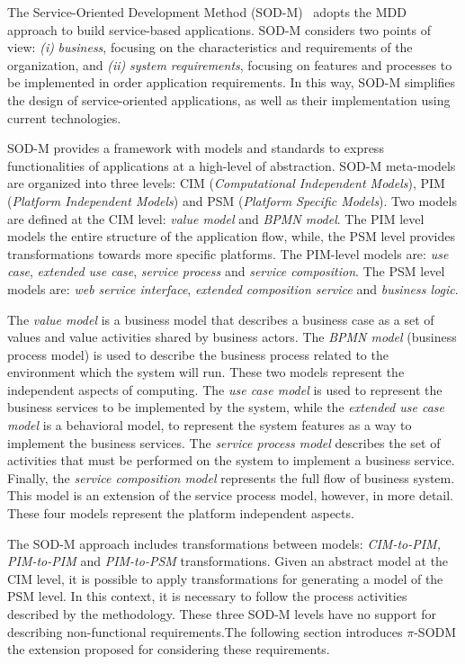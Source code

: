 
The Service-Oriented Development Method (SOD-M)~\cite{decastro1}
adopts  the MDD approach to build service-based applications. SOD-M considers two points of view:
\textit{(i)} \textit{business}, focusing on the characteristics and requirements
of the organization, and \textit{(ii)} \textit{system requirements}, focusing on
features and processes to be implemented in order application requirements. In
this way, SOD-M  simplifies the design of service-oriented applications, as
well as their implementation using current technologies.

SOD-M provides a framework with models and standards to express functionalities
of applications at a high-level of abstraction. SOD-M meta-models are organized 
into three levels: CIM (\textit{Computational Independent Models}), 
PIM (\textit{Platform Independent Models}) and PSM (\textit{Platform Specific Models}).
Two models are defined at the CIM level: \textit{value model} 
and \textit{BPMN model}. 
The PIM level models the entire structure of the application flow,
while, the PSM level provides transformations towards more specific platforms.
The PIM-level models are: \textit{use case}, \textit{extended use case}, \textit{service process} and
\textit{service composition}. The PSM level models are: \textit{web service interface}, \textit{extended composition service} and \textit{business logic}. 
 
The \textit{value model} is a business model that describes a business
case as a set of values and value activities shared by business actors. The
\textit{BPMN model} (business process model) is used to describe the business
process related to the environment which the system will run. These two models
represent the independent aspects of computing. The \textit{use case model} is used to represent
the business services to be implemented by the system, while the \textit{extended use case model} is a
behavioral model, to represent the system features as a way to implement
the business services. The \textit{service process model} describes the set of
activities that must be performed on the system to implement a business service.
Finally, the \textit{service composition model} represents the full flow of
business system. This model is an extension of the service process model,
however, in more detail. These four models represent the platform independent
aspects.

The SOD-M approach includes transformations between models:
\textit{CIM-to-PIM, PIM-to-PIM} and \textit{PIM-to-PSM} transformations. Given
an abstract model at the CIM level, it is possible to apply transformations for
generating a model of the PSM level. In this context, it is necessary to
follow the process activities described by the methodology. 
%
These three SOD-M levels have no support for describing non-functional requirements.The following section introduces $\pi$-SODM the extension proposed for considering these requirements.



